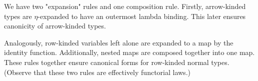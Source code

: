 \documentclass[authoryear, acmsmall, screen, review, nonacm]{acmart} %
\begin{document}
We have two "expansion" rules and one composition rule. Firstly, arrow-kinded types are $\eta$-expanded to have an outermost lambda binding. This later ensures canonicity of arrow-kinded types. 

\begin{code}    %
%
\>[4]\AgdaSpace{}%
\AgdaSymbol{:}\AgdaSpace{}%
\AgdaSpace{}%
\AgdaSymbol{\{}\AgdaSpace{}%
\AgdaSymbol{:}\AgdaSpace{}%
\AgdaSpace{}%
\AgdaSpace{}%
\AgdaSymbol{(}\AgdaSpace{}%
\AgdaSpace{}%
\AgdaSymbol{)\}}\AgdaSpace{}%
\AgdaSpace{}%
\AgdaSpace{}%
\AgdaSpace{}%
\AgdaSpace{}%
\AgdaSymbol{(}\AgdaSpace{}%
\AgdaSpace{}%
\AgdaSpace{}%
\AgdaSymbol{(}\AgdaSpace{}%
\AgdaSymbol{))}\<%
\end{code}

\Ni Analogously, row-kinded variables left alone are expanded to a map by the identity function. Additionally, nested maps are composed together into one map. These rules together ensure canonical forms for row-kinded normal types. (Observe that these two rules are effectively functorial laws.)
\end{document}
